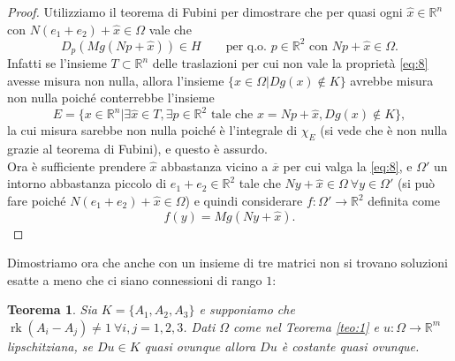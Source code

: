 \documentclass[a4paper,11pt]{book}
\theoremstyle{plain}
\newtheorem{teo}{Teorema}[chapter]
\theoremstyle{definition}
\theoremstyle{remark}
\newcommand{\R}{\mathbb{R}}
\DeclareMathOperator{\rk}{rk}
\begin{document}
\begin{proof}
	Utilizziamo il teorema di Fubini per dimostrare che per quasi ogni $\hat{x}\in\R^n$ con $N(e_1+e_2)+\hat{x}\in \Omega$ vale che
	\begin{equation}\label{eq:8}
		D_p(Mg(Np+\hat{x}))\in H\qquad\text{per q.o. }p\in\R^2\text{ con }Np+\hat{x}\in\Omega.
	\end{equation}
	Infatti se l'insieme $T\subset \R^n$ delle traslazioni per cui non vale la proprietà \eqref{eq:8} avesse misura non nulla, allora l'insieme $\{x\in\Omega|Dg(x)\not\in K\}$ avrebbe misura non nulla poiché conterrebbe l'insieme
	\[
		E=\{x\in\R^n|\exists \hat{x}\in T,\exists p\in \R^2\text{ tale che }x=Np+\hat{x}, Dg(x)\not\in K\},
	\]
	la cui misura sarebbe non nulla poiché è l'integrale di $\chi_E$ (si vede che è non nulla grazie al teorema di Fubini), e questo è assurdo.\\
	Ora è sufficiente prendere $\hat{x}$ abbastanza vicino a $\overline{x}$ per cui valga la \eqref{eq:8}, e $\Omega'$ un intorno abbastanza piccolo di $e_1+e_2\in\R^2$ tale che $Ny+\hat{x}\in\Omega\ \forall y\in\Omega'$ (si può fare poiché $N(e_1+e_2)+\hat{x}\in\Omega$) e quindi considerare $f:\Omega'\to\R^2$ definita come
	\[
		f(y) = Mg(Ny+\hat{x}).
	\]
\end{proof}


Dimostriamo ora che anche con un insieme di tre matrici non si trovano soluzioni esatte a meno che ci siano connessioni di rango $1$:
\begin{teo}\label{teo:2}
	Sia $K=\{A_1,A_2,A_3\}$ e supponiamo che $\rk(A_i-A_j)\neq 1\ \forall i,j=1,2,3$. Dati $\Omega$ come nel Teorema \ref{teo:1} e $u:\Omega\to\R^{m}$ lipschitziana, se $Du\in K$ quasi ovunque allora $Du$ è costante quasi ovunque.
\end{teo}
\end{document}
